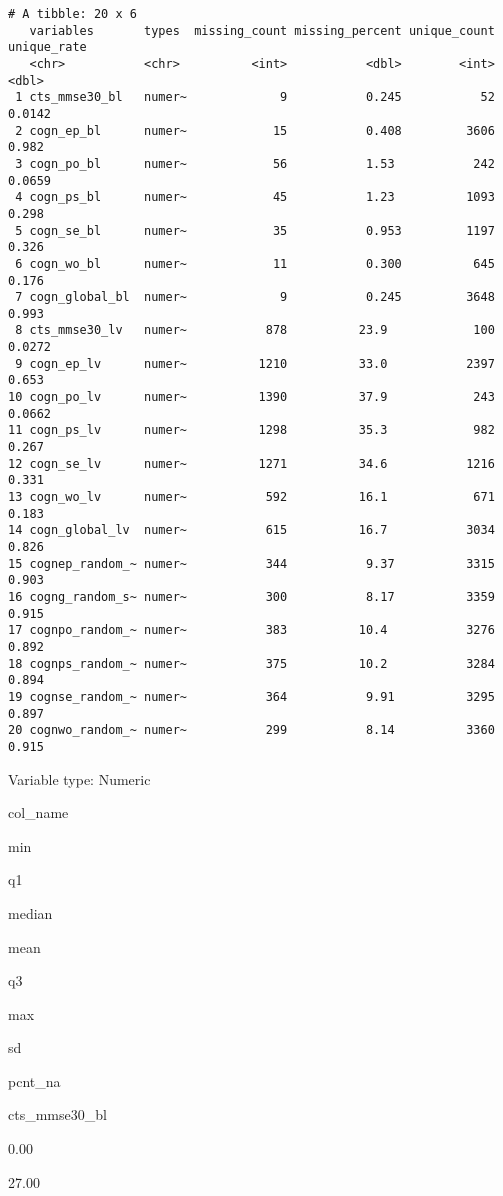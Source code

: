 \documentclass[]{book}
\begin{document}
\begin{verbatim}
# A tibble: 20 x 6
   variables       types  missing_count missing_percent unique_count unique_rate
   <chr>           <chr>          <int>           <dbl>        <int>       <dbl>
 1 cts_mmse30_bl   numer~             9           0.245           52      0.0142
 2 cogn_ep_bl      numer~            15           0.408         3606      0.982 
 3 cogn_po_bl      numer~            56           1.53           242      0.0659
 4 cogn_ps_bl      numer~            45           1.23          1093      0.298 
 5 cogn_se_bl      numer~            35           0.953         1197      0.326 
 6 cogn_wo_bl      numer~            11           0.300          645      0.176 
 7 cogn_global_bl  numer~             9           0.245         3648      0.993 
 8 cts_mmse30_lv   numer~           878          23.9            100      0.0272
 9 cogn_ep_lv      numer~          1210          33.0           2397      0.653 
10 cogn_po_lv      numer~          1390          37.9            243      0.0662
11 cogn_ps_lv      numer~          1298          35.3            982      0.267 
12 cogn_se_lv      numer~          1271          34.6           1216      0.331 
13 cogn_wo_lv      numer~           592          16.1            671      0.183 
14 cogn_global_lv  numer~           615          16.7           3034      0.826 
15 cognep_random_~ numer~           344           9.37          3315      0.903 
16 cogng_random_s~ numer~           300           8.17          3359      0.915 
17 cognpo_random_~ numer~           383          10.4           3276      0.892 
18 cognps_random_~ numer~           375          10.2           3284      0.894 
19 cognse_random_~ numer~           364           9.91          3295      0.897 
20 cognwo_random_~ numer~           299           8.14          3360      0.915 
\end{verbatim}

\label{tab:rosmap-cog-numeric}Variable type: Numeric

col\_name

min

q1

median

mean

q3

max

sd

pcnt\_na

cts\_mmse30\_bl

0.00

27.00
\end{document}
